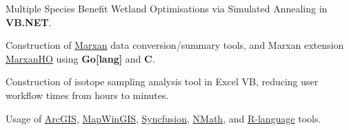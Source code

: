 \documentclass{resume}
\begin{document}
\begin{WorkHistory}
{      \item {\bfseries} Multiple Species Benefit Wetland Optimisations via Simulated Annealing in {\bfseries VB.NET}.
      \item Construction of \href{http://www.uq.edu.au/marxan/}{Marxan} data conversion/summary tools, and Marxan extension \href{https://github.com/LindsayBradford/MarxanHO}{MarxanHO} using {\bfseries Go[lang]} and {\bfseries C}. 
      \item Construction of isotope sampling analysis tool in Excel VB, reducing user workflow times from hours to minutes.
      \item Usage of \href{http://www.esri.com/software/arcgis/}{ArcGIS}, \href{http://mapwingis.codeplex.com/}{MapWinGIS}, \href{http://www.syncfusion.com/}{Syncfusion}, \href{http://www.centerspace.net/products/c-sharp-vb-net-math-library-products/}{NMath}, and \href{http://www.r-project.org/}{R-language} tools.
    }
  \end{WorkHistory}
\end{document}
